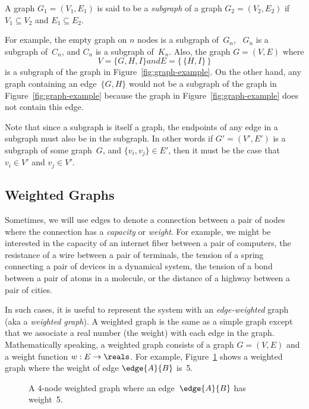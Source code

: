 \begin{definition}\label{def:subgraph}
A graph $G_1 = (V_1, E_1)$ is said to be a \emph{subgraph} of a graph
$G_2 = (V_2, E_2)$ if
$V_1 \subseteq V_2$ and $E_1 \subseteq E_2$.
\end{definition}

For example, the empty graph on $n$ nodes is a subgraph of~$G_n$,
\ $G_n$ is a subgraph of~$C_n$, and $C_n$ is a subgraph of~$K_n$.
Also, the graph $G = (V, E)$ where
\begin{equation*}
    V = \{ G, H, I \} and E = \{\, \{ H, I \} \,\}
\end{equation*}
is a subgraph of the graph in Figure~\ref{fig:graph-example}.  On the
other hand, any graph containing an edge~$\{G, H\}$ would not be a
subgraph of the graph in Figure~\ref{fig:graph-example} because the
graph in Figure~\ref{fig:graph-example} does not contain this edge.

Note that since a subgraph is itself a graph, the endpoints of any
edge in a subgraph must also be in the subgraph.  In other words if
$G' = (V', E')$ is a subgraph of some graph~$G$, and $\{ v_i, v_j \}
\in E'$, then it must be the case that $v_i \in V'$ and $v_j \in V'$.

\subsection{Weighted Graphs}

Sometimes, we will use edges to denote a connection between a pair of
nodes where the connection has a \emph{capacity} or \emph{weight}.
For example, we might be interested in the capacity of an internet
fiber between a pair of computers, the resistance of a wire between a
pair of terminals, the tension of a spring connecting a pair of
devices in a dynamical system, the tension of a bond between a pair of
atoms in a molecule, or the distance of a highway between a pair of
cities.

In such cases, it is useful to represent the system with an
\emph{edge-weighted} graph (aka a \emph{weighted graph}).  A weighted
graph is the same as a simple graph except that we associate a real
number (\ie the weight) with each edge in the graph.  Mathematically
speaking, a weighted graph consists of a graph $G = (V, E)$ and a
weight function $w: E \to \reals$.  For example,
Figure~\ref{fig:weighted_graph} shows a weighted graph where the
weight of edge $\edge{A}{B}$ is~5.

\begin{figure}
\missinggraphic

\caption{A 4-node weighted graph where an edge~$\edge{A}{B}$ has
  weight~5.}
\label{fig:weighted_graph}
\end{figure}


